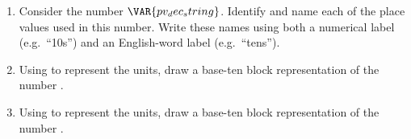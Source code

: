 

\begin{enumerate}
    \item Consider the number $\VAR{pv_dec_string}$. Identify and name each of the place values used in this number. Write these names using both a numerical label (e.g.\ ``10s'') and an English-word label (e.g.\ ``tens'').

    \vspace{20pt}
    \begin{ansenv}
    \end{ansenv}
    \vfill

    \item Using  to represent the units, draw a base-ten block representation of the number .

    \vspace{20pt}
    \begin{ansenv}
    \end{ansenv}
    \vfill

    \item Using  to represent the units, draw a base-ten block representation of the number .

    \vspace{20pt}
    \begin{ansenv}
    \end{ansenv}
    \vfill
\end{enumerate}

\newpage


